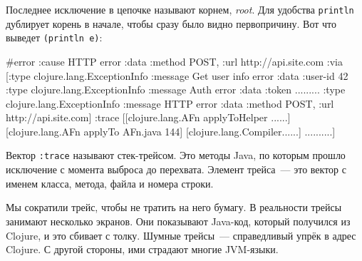Последнее исключение в цепочке называют корнем, \emph{root}. Для удобства
\verb|println| дублирует корень в начале, чтобы сразу было видно
первопричину. Вот что выведет \verb|(println e)|:


\ifx\devicetype\mobile

\begin{english}
  \begin{clojure}
#error {
 :cause HTTP error
 :data {:method POST,
        :url http://api.site.com}
 :via
 [{:type clojure.lang.ExceptionInfo
   :message Get user info error
   :data {:user-id 42}}
  {:type clojure.lang.ExceptionInfo
   :message Auth error
   :data {:token .........}}
  {:type clojure.lang.ExceptionInfo
   :message HTTP error
   :data {:method POST,
          :url http://api.site.com}}]
 :trace
 [[clojure.lang.AFn applyToHelper ......]
  [clojure.lang.AFn applyTo AFn.java 144]
  [clojure.lang.Compiler......]
  ..........]}
  \end{clojure}
\end{english}

\else

\begin{english}
\end{english}

\fi


Вектор \verb|:trace| называют стек-трейсом. Это методы Java, по которым прошло
исключение с момента выброса до перехвата. Элемент трейса~--- это вектор с именем
класса, метода, файла и номера строки.

Мы сократили трейс, чтобы не тратить на него бумагу. В реальности трейсы
занимают несколько экранов. Они показывают Java-код, который получился из
Clojure, и это сбивает с толку. Шумные трейсы~--- справедливый упрёк в адрес
Clojure. С другой стороны, ими страдают многие JVM-языки.

